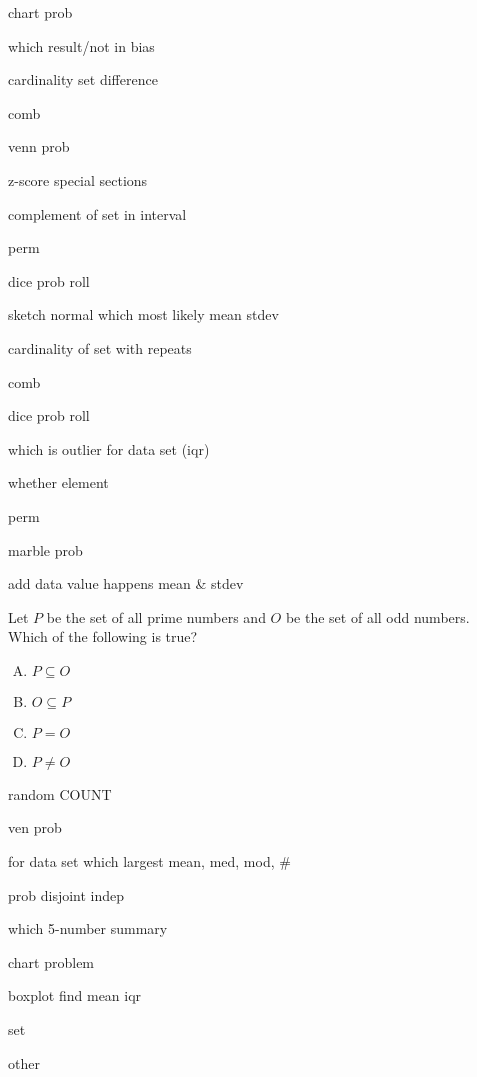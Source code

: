 \documentclass[12pt,letterpaper]{exam}
\begin{document}
\begin{questions}
 chart prob

 which result/not in bias

 cardinality set difference

 comb 

 venn prob

 z-score special sections

 complement of set in interval

 perm 

 dice prob roll

 sketch normal which most likely mean stdev

 cardinality of set with repeats 

 comb

 dice prob roll

 which is outlier for data set (iqr)

 whether element

 perm

 marble prob

 add data value happens mean \& stdev

\question Let $P$ be the set of all prime numbers and $O$ be the set of all odd numbers. Which of the following is true?
	\begin{enumerate}[A.]
	\item $P \subseteq O$
	\item $O \subseteq P$
	\item $P= O$
	\item $P \neq O$
	\end{enumerate}


 random COUNT

 ven prob

 for data set which largest mean, med, mod, \#

\question prob disjoint indep

 which 5-number summary

 chart problem

 boxplot find mean iqr

\question set

\question other


\end{questions}
\end{document}
